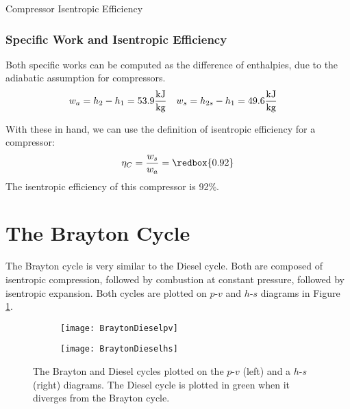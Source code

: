 \begin{example}[label=ex:isentropicEffCompressor]{Compressor Isentropic Efficiency}
  \subsubsection*{Specific Work and Isentropic Efficiency}
  Both specific works can be computed as the difference of enthalpies, due to the adiabatic assumption for compressors.
  \begin{align*}
    w_a &= h_2 - h_1 = 53.9 \frac{\rm kJ}{\rm kg} & w_s &= h_{2s} - h_1 = 49.6 \frac{\rm kJ}{\rm kg}
  \end{align*}

  With these in hand, we can use the definition of isentropic efficiency for a compressor:
  \begin{equation*}
    \eta_C = \frac{w_s}{w_a} = \redbox{0.92}
  \end{equation*}
  The isentropic efficiency of this compressor is 92\%.
\end{example}


\section{The Brayton Cycle} \label{sec:Brayton}

The Brayton cycle is very similar to the Diesel cycle.  Both are composed of isentropic compression, followed by combustion at constant pressure, followed by isentropic expansion.  Both cycles are plotted on $p$-$v$ and $h$-$s$ diagrams in Figure \ref{fig:BraytonDieselComp}.

\begin{figure}[H]
\centering
\begin{subfigure}{.5\textwidth}
  \centering
  \texttt{[image: BraytonDieselpv]}
\end{subfigure}%
\begin{subfigure}{.5\textwidth}
  \centering
  \texttt{[image: BraytonDieselhs]}
\end{subfigure}
\caption{The Brayton and Diesel cycles plotted on the $p$-$v$ (left) and a $h$-$s$ (right) diagrams.  The Diesel cycle is plotted in green when it diverges from the Brayton cycle.}
\label{fig:BraytonDieselComp}
\end{figure}

